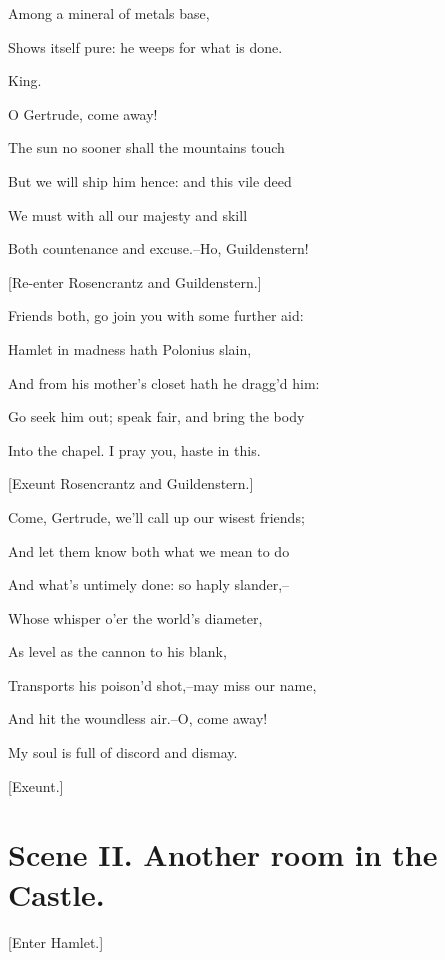 \documentclass[12pt]{book}
\begin{document}
Among a mineral of metals base,

Shows itself pure: he weeps for what is done.



King.

O Gertrude, come away!

The sun no sooner shall the mountains touch

But we will ship him hence: and this vile deed

We must with all our majesty and skill

Both countenance and excuse.--Ho, Guildenstern!



[Re-enter Rosencrantz and Guildenstern.]



Friends both, go join you with some further aid:

Hamlet in madness hath Polonius slain,

And from his mother's closet hath he dragg'd him:

Go seek him out; speak fair, and bring the body

Into the chapel. I pray you, haste in this.



[Exeunt Rosencrantz and Guildenstern.]



Come, Gertrude, we'll call up our wisest friends;

And let them know both what we mean to do

And what's untimely done: so haply slander,--

Whose whisper o'er the world's diameter,

As level as the cannon to his blank,

Transports his poison'd shot,--may miss our name,

And hit the woundless air.--O, come away!

My soul is full of discord and dismay.



[Exeunt.]



\section*{Scene II. Another room in the Castle.}



[Enter Hamlet.]
\end{document}
